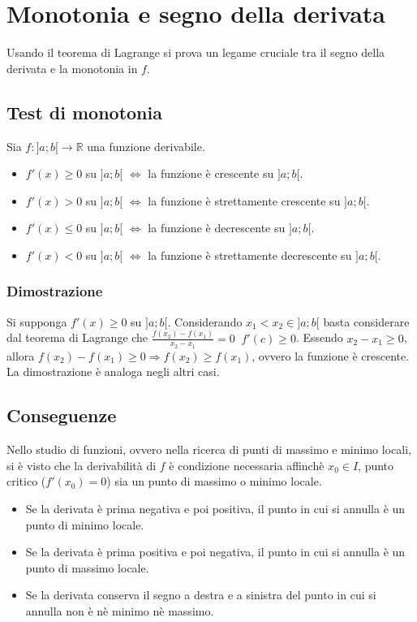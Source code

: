 \section{Monotonia e segno della derivata}
Usando il teorema di Lagrange si prova un legame cruciale tra il segno della derivata e la monotonia in $f$.
\subsection{Test di monotonia}
Sia $f:]a;b[\rightarrow\mathbb{R}$ una funzione derivabile.
\begin{itemize}
\item $f'(x)\ge 0$ su $]a;b[$ $\Leftrightarrow$ la funzione \`e crescente su $]a;b[$.
\item $f'(x)> 0$ su $]a;b[$ $\Leftrightarrow$ la funzione \`e strettamente crescente su $]a;b[$.
\item $f'(x)\le 0$ su $]a;b[$ $\Leftrightarrow$ la funzione \`e decrescente su $]a;b[$.
\item $f'(x)< 0$ su $]a;b[$ $\Leftrightarrow$ la funzione \`e strettamente decrescente su $]a;b[$.
\end{itemize}
\subsubsection{Dimostrazione}
Si supponga $f'(x)\ge 0$ su $]a;b[$. Considerando $x_1<x_2\in ]a;b[$ basta considerare dal teorema di Lagrange che $\frac{f(x_2)-f(x_1)}{x_2-x_1}=0\;\;f'(c)\ge 0$. Essendo $x_2-
x_1\ge 0$, allora $f(x_2)-f(x_1)\ge 0\Rightarrow f(x_2)\ge f(x_1)$, ovvero la funzione \`e crescente. La dimostrazione \`e analoga negli altri casi.
\subsection{Conseguenze}
Nello studio di funzioni, ovvero nella ricerca di punti di massimo e minimo locali, si \`e visto che la derivabilit\`a di $f$ \`e condizione necessaria affinch\`e $x_0\in I$,
punto critico ($f'(x_0)=0$) sia un punto di massimo o minimo locale.
\begin{itemize}
\item Se la derivata \`e prima negativa e poi positiva, il punto in cui si annulla \`e un punto di minimo locale.
\item Se la derivata \`e prima positiva e poi negativa, il punto in cui si annulla \`e un punto di massimo locale.
\item Se la derivata conserva il segno a destra e a sinistra del punto in cui si annulla non \`e n\`e minimo n\`e massimo.
\end{itemize}


